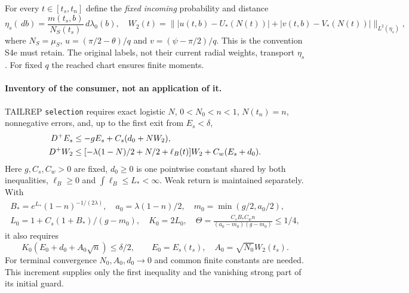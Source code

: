 \documentclass[11pt]{article}
\numberwithin{equation}{section}
\theoremstyle{remark}\newtheorem{remark}[theorem]{Remark}
\newcommand{\dd}{\,d}\newcommand{\E}{\mathbb E}
\begin{document}
For every $t\in[t_s,t_n]$ define the \emph{fixed incoming} probability
and distance
\begin{equation}
 \eta_s(\dd b)=\frac{m(t_s,b)}{N_S(t_s)}\dd\lambda_0(b),\quad
 W_2(t)=\big\||u(t,b)-U_*(N(t))|+|v(t,b)-V_*(N(t))|\big\|_{L^2(\eta_s)},
 \label{an03srrv1:W}
\end{equation}
where $N_S=\mu_S$, $u=(\pi/2-\theta)/q$ and
$v=(\psi-\pi/2)/q$. This is the convention S4e must retain.
The original labels, not their current radial weights, transport
$\eta_s$. For fixed $q$ the reached chart ensures finite moments.

\paragraph{Inventory of the consumer, not an application of it.}
TAILREP \texttt{selection} requires exact logistic $N$,
$0<N_0<n<1$, $N(t_n)=n$, nonnegative errors, and, up to the first
exit from $E_s<\delta$,
\begin{align}
 D^+E_s&\le-gE_s+C_s(d_0+NW_2),\notag\\
 D^+W_2&\le[-\lambda(1-N)/2+N/2+\ell_B(t)]W_2+C_w(E_s+d_0).
 \label{an03srrv1:consumer}
\end{align}
Here $g,C_s,C_w>0$ are fixed, $d_0\ge0$ is one pointwise
constant shared by both inequalities, $\ell_B\ge0$ and
$\int\ell_B\le L_*<\infty$. Weak return is maintained separately.
With
\begin{gather*}
 B_*=e^{L_*}(1-n)^{-1/(2\lambda)},\quad
 a_0=\lambda(1-n)/2,\quad m_0=\min(g/2,a_0/2),\\
 L_0=1+C_s(1+B_*)/(g-m_0),\quad K_0=2L_0,
 \quad\Theta=\frac{C_sB_*C_wn}{(a_0-m_0)(g-m_0)}\le1/4,
\end{gather*}
it also requires
\begin{equation}
 K_0(E_0+d_0+A_0\sqrt n)\le\delta/2,\qquad
 E_0=E_s(t_s),\quad A_0=\sqrt{N_0}W_2(t_s).
 \label{an03srrv1:consumerGuard}
\end{equation}
For terminal convergence $N_0,A_0,d_0\to0$ and common finite
constants are needed. This increment supplies only the first
inequality and the vanishing strong part of its initial guard.
\end{document}
